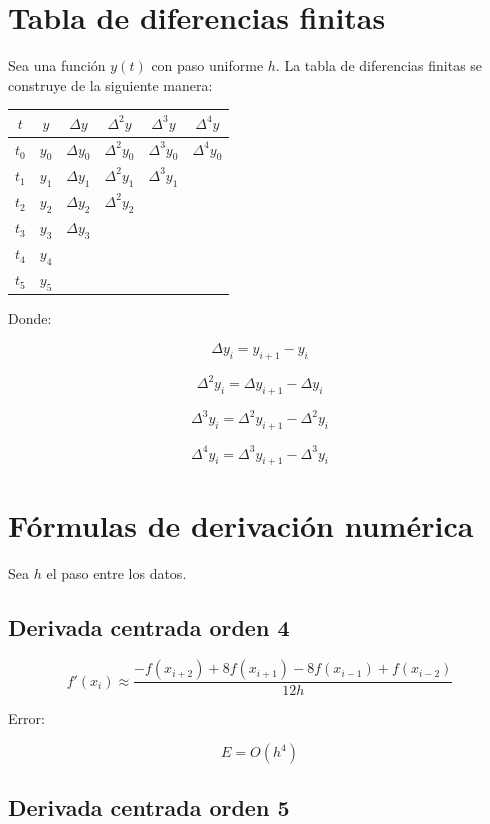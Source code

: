 \documentclass[12pt]{article}
\begin{document}
\section*{Tabla de diferencias finitas}

Sea una función $y(t)$ con paso uniforme $h$. La tabla de diferencias finitas se construye de la siguiente manera:

\begin{center}
\begin{tabular}{c|c|c|c|c|c}
$t$ & $y$ & $\Delta y$ & $\Delta^2 y$ & $\Delta^3 y$ & $\Delta^4 y$ \\
\hline
$t_0$ & $y_0$ & $\Delta y_0$ & $\Delta^2 y_0$ & $\Delta^3 y_0$ & $\Delta^4 y_0$ \\
$t_1$ & $y_1$ & $\Delta y_1$ & $\Delta^2 y_1$ & $\Delta^3 y_1$ &  \\
$t_2$ & $y_2$ & $\Delta y_2$ & $\Delta^2 y_2$ &  &  \\
$t_3$ & $y_3$ & $\Delta y_3$ &  &  &  \\
$t_4$ & $y_4$ &  &  &  &  \\
$t_5$ & $y_5$ &  &  &  &  \\
\end{tabular}
\end{center}

Donde:

\[
\Delta y_i = y_{i+1} - y_i
\]

\[
\Delta^2 y_i = \Delta y_{i+1} - \Delta y_i
\]

\[
\Delta^3 y_i = \Delta^2 y_{i+1} - \Delta^2 y_i
\]

\[
\Delta^4 y_i = \Delta^3 y_{i+1} - \Delta^3 y_i
\]


\section*{Fórmulas de derivación numérica}

Sea $h$ el paso entre los datos.

\subsection*{Derivada centrada orden 4}

\[
f'(x_i) \approx 
\frac{-f(x_{i+2}) + 8f(x_{i+1}) - 8f(x_{i-1}) + f(x_{i-2})}{12h}
\]

Error:

\[
E = O(h^4)
\]


\subsection*{Derivada centrada orden 5}
\end{document}
